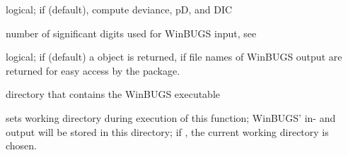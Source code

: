 \begin{Arguments}
\begin{ldescription}
\item[\code{DIC}] logical; if  (default), compute deviance, pD, and DIC
\item[\code{digits}] number of significant digits used for WinBUGS input, see 
\item[\code{codaPkg}] logical; if  (default) a  object is returned,
if  file names of WinBUGS output are returned for easy access by the  package.
\item[\code{bugs.directory}] directory that contains the WinBUGS executable
\item[\code{working.directory}] sets working directory during execution of this function;
WinBUGS' in- and output will be stored in this directory;
if , the current working directory is chosen.
\end{ldescription}
\end{Arguments}
